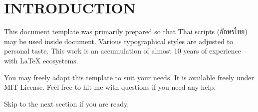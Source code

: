 
\section{INTRODUCTION}

This document template was primarily prepared so that
Thai scripts (อักษรไทย) may be used inside \XeLaTeX{} document.
Various typographical styles are adjusted to personal taste.
This work is an accumulation of almost 10 years of experience with \LaTeX{} ecosystems.

You may freely adapt this template to suit your needs.
It is available freely under MIT License.
Feel free to hit me with questions if you need any help.

Skip to the next section if you are ready.

\lipsum[1]
